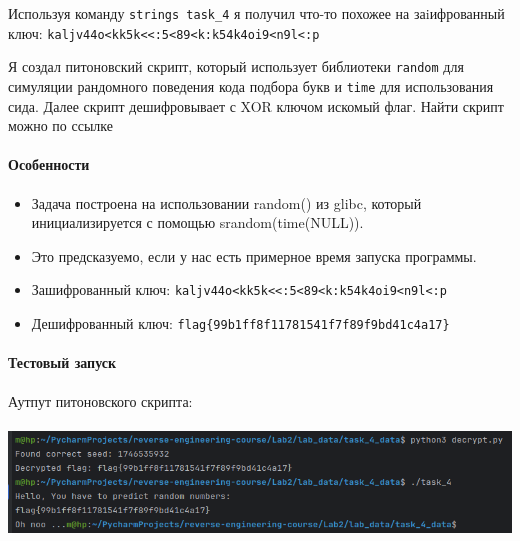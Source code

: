 Используя команду \texttt{strings task\_4} я получил что-то похожее на заiифрованный ключ: \texttt{kaljv44o<kk5k<<:5<89<k:k54k4oi9<n9l<:p}

Я создал питоновский скрипт, который использует библиотеки \texttt{random} для симуляции рандомного поведения кода
подбора букв и \texttt{time} для использования сида.
Далее скрипт дешифровывает с XOR ключом искомый флаг.
Найти скрипт можно по ссылке\cite{githublink}

\paragraph{Особенности}
\begin{itemize}
    \item Задача построена на использовании random() из glibc, который инициализируется с помощью srandom(time(NULL)).
    \item Это предсказуемо, если у нас есть примерное время запуска программы.
    \item Зашифрованный ключ: \texttt{kaljv44o<kk5k<<:5<89<k:k54k4oi9<n9l<:p}
    \item Дешифрованный ключ: \texttt{flag\{99b1ff8f11781541f7f89f9bd41c4a17\}}
\end{itemize}

\paragraph{Тестовый запуск}
Аутпут питоновского скрипта:

\paragraph{}
\includegraphics[width=1\linewidth]{static/solution_task_4}

